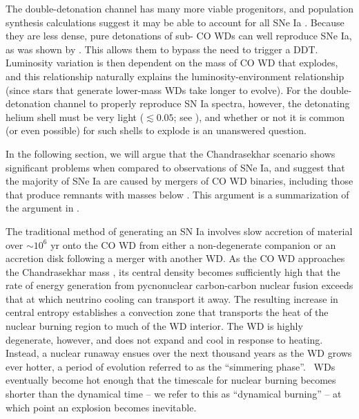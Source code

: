 {The double-detonation channel has many more viable progenitors, and population synthesis calculations suggest it may be able to account for all SNe Ia \citep{ruit+11}.  Because they are less dense, pure detonations of sub-{\Mch} CO WDs can well reproduce SNe Ia, as was shown by \cite{sim+10}.  This allows them to bypass the need to trigger a DDT.  Luminosity variation is then dependent on the mass of CO WD that explodes, and this relationship naturally explains the luminosity-environment relationship (since stars that generate lower-mass WDs take longer to evolve).  For the double-detonation channel to properly reproduce SN Ia spectra, however, the detonating helium shell must be very light ($\lesssim 0.05${\Msun}; see \citealt{woosk11}), and whether or not it is common (or even possible) for such shells to explode is an unanswered question.



In the following section, we will argue that the Chandrasekhar scenario shows significant problems when compared to observations of SNe Ia, and suggest that the majority of SNe Ia are caused by mergers of CO WD binaries, including those that produce remnants with masses below \Mch.  This argument is a summarization of the argument in \cite{vankerkwijk}.

The traditional method of generating an SN Ia involves slow accretion of material over $\sim10^6$ yr onto the CO WD from either a non-degenerate companion or an accretion disk following a merger with another WD.  As the CO WD approaches the Chandrasekhar mass \Mch, its central density becomes sufficiently high that the rate of energy generation from pycnonuclear carbon-carbon nuclear fusion exceeds that at which neutrino cooling can transport it away.  The resulting increase in central entropy establishes a convection zone that transports the heat of the nuclear burning region to much of the WD interior.  The WD is highly degenerate, however, and does not expand and cool in response to heating.  Instead, a nuclear runaway ensues over the next thousand years as the WD grows ever hotter, a period of evolution referred to as the ``simmering phase''.  \Mch\ WDs eventually become hot enough that the timescale for nuclear burning becomes shorter than the dynamical time -- we refer to this as ``dynamical burning'' -- at which point an explosion becomes inevitable.





}
